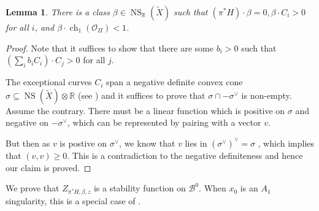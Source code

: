 \documentclass[12pt]{amsart}
\newtheorem{lemma}[theorem]{Lemma}
\theoremstyle{definition}
\DeclareMathOperator{\ch}{ch}
\DeclareMathOperator{\NS}{NS}
\begin{document}
\begin{lemma}\label{betaexists}
There is a class $\beta \in \NS_\mathbb{R}(\widetilde{X})$ such that $(\pi^\ast H)\cdot \beta =0, \beta \cdot C_i>0$ for all $i$, and 
$\beta \cdot \ch_1(\mathcal{O}_{\Pi}) <1$.
\end{lemma}
\begin{proof}
Note that it suffices to show that there are some $b_i>0$ such that $(\displaystyle \sum_i b_iC_i) \cdot C_j >0$ for all $j$.

The exceptional curves $C_i$ span a negative definite convex cone $\sigma \subseteq \NS(\widetilde{X}) \otimes \mathbb{R}$ (see \cite[Theorem A.7]{Reid}) 
and it suffices to prove that $\sigma \cap -\sigma^\vee$ is non-empty.
Assume the contrary. 
There must be a linear function which is positive on $\sigma$ and negative on $-\sigma^\vee$, 
which can be represented by pairing with a vector $v$.

But then as $v$ is postive on $\sigma^\vee$, we know that $v$ lies in $(\sigma^\vee)^\vee = \sigma$ , which implies that $(v,v)\geq 0$.   
This is a contradiction to the negative definiteness and hence our claim is proved.
\end{proof}

We prove that $Z_{\pi^\ast H,\beta,z}$ is a stability function on $\mathcal{B}^0$. 
When $x_0$ is an $A_1$ singularity,
this is a special case of \cite[Lemma 5.2]{TX22}.
\end{document}
